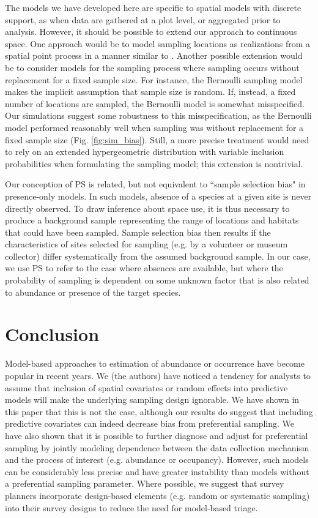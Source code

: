 \documentclass[times,mee,doublespace,]{besauth2}
\begin{document}
The models we have developed here are specific to spatial models with discrete support, as when data are gathered at a plot level, or aggregated prior to analysis.  However, it should be possible to extend our approach to continuous space.  One approach would be to model sampling locations as realizations from a spatial point process in a manner similar to \citet{WartonShepherd2010}. Another possible extension would be to consider models for the sampling process where sampling occurs without replacement for a fixed sample size.  For instance, the Bernoulli sampling model makes the implicit assumption that sample size is random.  If, instead, a fixed number of locations are sampled, the Bernoulli model is somewhat misspecified.  Our simulations suggest some robustness to this misspecification, as the Bernoulli model performed reasonably well when sampling was without replacement for a fixed sample size (Fig. \ref{fig:sim_bias}).  Still, a more precise treatment would need to rely on an extended hypergeometric distribution with variable inclusion probabilities when formulating the sampling model; this extension is nontrivial.

Our conception of PS is related, but not equivalent to ``sample selection bias" \citep[e.g.][]{PhillipsEtAl2009} in presence-only models.  In such models, absence of a species at a given site is never directly observed.  To draw inference about space use, it is thus necessary to produce a background sample representing the range of locations and habitats that could have been sampled. Sample selection bias then results if the characteristics of sites selected for sampling (e.g. by a volunteer or museum collector) differ systematically from the assumed background sample.  In our case, we use PS to refer to the case where absences are available, but where the probability of sampling is dependent on some unknown factor that is also related to abundance or presence of the target species.

\section{Conclusion}

Model-based approaches to estimation of abundance or occurrence have become popular in recent years.  We (the authors) have noticed a tendency for analysts to assume that inclusion of spatial covariates or random effects into predictive models will make the underlying sampling design ignorable. We have shown in this paper that this is not the case, although our results do suggest that including predictive covariates can indeed decrease bias from preferential sampling.  We have also shown that it is possible to further diagnose and adjust for preferential sampling by jointly modeling dependence between the data collection mechanism and the process of interest (e.g. abundance or occupancy).  However, such models can be considerably less precise and have greater instability than models without a preferential sampling parameter. Where possible, we suggest that survey planners incorporate design-based elements (e.g. random or systematic sampling) into their survey designs to reduce the need for model-based triage.
\end{document}
